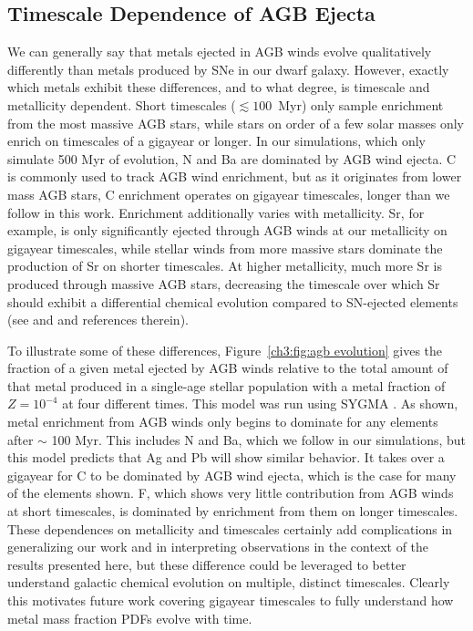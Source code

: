
\subsection{Timescale Dependence of AGB Ejecta}
\label{ch3:sec:discussion:metal yields}
We can generally say that metals ejected in AGB winds evolve qualitatively differently than metals produced by SNe in our dwarf galaxy. However, exactly which metals exhibit these differences, and to what degree, is timescale and metallicity dependent. Short timescales ($\lesssim 100$~Myr) only sample enrichment from the most massive AGB stars, while stars on order of a few solar masses only enrich on timescales of a gigayear or longer. In our simulations, which only simulate 500 Myr of evolution, N and Ba are dominated by AGB wind ejecta. C is commonly used to track AGB wind enrichment, but as it originates from lower mass AGB stars, C enrichment operates on gigayear timescales, longer than we follow in this work. Enrichment additionally varies with metallicity. Sr, for example, is only significantly ejected through AGB winds at our metallicity on gigayear timescales, while stellar winds from more massive stars dominate the production of Sr on shorter timescales. At higher metallicity, much more Sr is produced through massive AGB stars, decreasing the timescale over which Sr should exhibit a differential chemical evolution compared to SN-ejected elements (see \cite{Ritter2018} and \cite{Ritter2018b} and references therein).

To illustrate some of these differences, Figure~\ref{ch3:fig:agb evolution} gives the fraction of a given metal ejected by AGB winds relative to the total amount of that metal produced in a single-age stellar population with a metal fraction of $Z = 10^{-4}$ at four different times. This model was run using \textsc{SYGMA} \citep{Ritter2018b}. As shown, metal enrichment from AGB winds only begins to dominate for any elements after $\sim$ 100 Myr. This includes N and Ba, which we follow in our simulations, but this model predicts that Ag and Pb will show similar behavior. It takes over a gigayear for C to be dominated by AGB wind ejecta, which is the case for many of the elements shown. F, which shows very little contribution from AGB winds at short timescales, is dominated by enrichment from them on longer timescales. These dependences on metallicity and timescales certainly add complications in generalizing our work and in interpreting observations in the context of the results presented here, but these difference could be leveraged to better understand galactic chemical evolution on multiple, distinct timescales. Clearly this motivates future work covering gigayear timescales to fully understand how metal mass fraction PDFs evolve with time.

